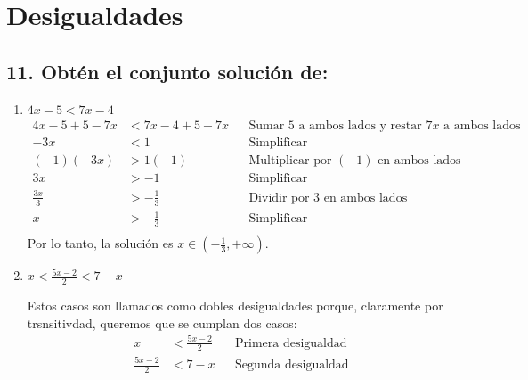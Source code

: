 \documentclass{article}
\begin{document}
\section*{Desigualdades}

\subsection*{11. Obtén el conjunto solución de:}

\begin{enumerate}
  \item \(4x-5<7x-4\)
  \begin{align*}
  4x - 5 + 5 - 7x & < 7x - 4 + 5 - 7x && \text{Sumar } 5 \text{ a ambos lados y restar } 7x \text{ a ambos lados} \\
   -3x & < 1 && \text{Simplificar} \\
   (-1)(-3x) & > 1(-1) && \text{Multiplicar por } (-1) \text{ en ambos lados} \\
   3x & > -1 && \text{Simplificar} \\
   \frac{3x}{3} & > -\frac{1}{3} && \text{Dividir por } 3 \text{ en ambos lados} \\
   x & > -\frac{1}{3} && \text{Simplificar} \\
   \end{align*}
   Por lo tanto, la solución es \(x \in \left(-\frac{1}{3}, +\infty\right)\).\\

   
  \item \(x<\frac{5x-2}{2}<7-x\)
  
Estos casos son llamados como dobles desigualdades porque, claramente por trsnsitivdad, queremos que se cumplan dos casos:
\begin{align*}
   x & < \frac{5x - 2}{2} && \text{Primera desigualdad} \\
   \frac{5x - 2}{2} & < 7 - x && \text{Segunda desigualdad} \\
   \end{align*}
   

\end{enumerate}
\end{document}
